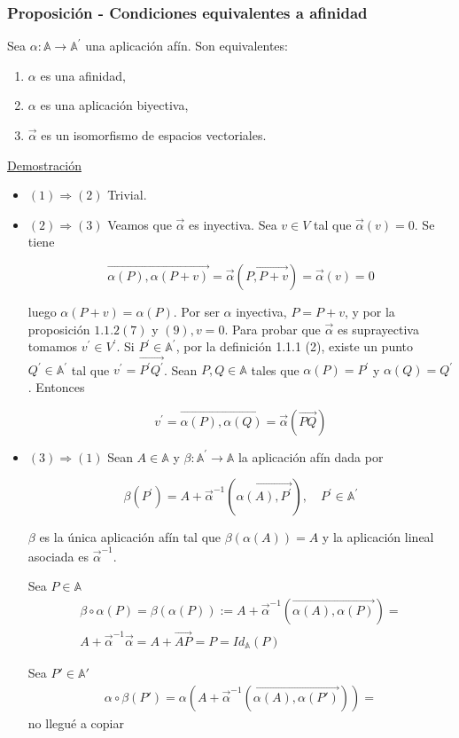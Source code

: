 \documentclass[12pt, a4paper, ones, notitlepage, openany,titlepage]{article}
\newcommand{\demostracion}{\noindent\underline{Demostración}}
\begin{document}
\subsubsection{Proposición - Condiciones equivalentes a afinidad}
	\noindent Sea $\alpha: \mathbb{A} \rightarrow \mathbb{A}^{\prime}$ una aplicación afín. Son equivalentes:
	\begin{enumerate}
		\item $\alpha$ es una afinidad,
		
		\item $\alpha$ es una aplicación biyectiva,
		
		\item $\vec{\alpha}$ es un isomorfismo de espacios vectoriales.
	\end{enumerate}

\demostracion 
	\begin{itemize}
		\item$(1) \Rightarrow(2)$ Trivial.
		
		\item$(2) \Rightarrow(3)$ Veamos que $\vec{\alpha}$ es inyectiva. Sea $v \in V$ tal que $\vec{\alpha}(v)=0$. Se tiene
		
		$$
		\overrightarrow{\alpha(P), \alpha(P+v)}=\vec{\alpha}(\overrightarrow{P, P+v})=\vec{\alpha}(v)=0
		$$
		
		luego $\alpha(P+v)=\alpha(P)$. Por ser $\alpha$ inyectiva, $P=P+v$, y por la proposición $1.1 .2(7)$ y $(9), v=0$. Para probar que $\vec{\alpha}$ es suprayectiva tomamos $v^{\prime} \in V^{\prime}$. Si $P^{\prime} \in \mathbb{A}^{\prime}$, por la definición 1.1.1 (2), existe un punto $Q^{\prime} \in \mathbb{A}^{\prime}$ tal que $v^{\prime}=\overrightarrow{P^{\prime} Q^{\prime}}$. Sean $P, Q \in \mathbb{A}$ tales que $\alpha(P)=P^{\prime}$ y $\alpha(Q)=Q^{\prime}$. Entonces
		
		$$
		v^{\prime}=\overrightarrow{\alpha(P), \alpha(Q)}=\vec{\alpha}(\overrightarrow{P Q})
		$$
		
		\item$(3) \Rightarrow(1)$ Sean $A \in \mathbb{A}$ y $\beta: \mathbb{A}^{\prime} \rightarrow \mathbb{A}$ la aplicación afín dada por
		
		$$
		\beta\left(P^{\prime}\right)=A+\vec{\alpha}^{-1}\left(\overrightarrow{\alpha(A), P^{\prime}}\right), \quad P^{\prime} \in \mathbb{A}^{\prime}
		$$
		
		$\beta$ es la única aplicación afín tal que $\beta(\alpha(A))=A$ y la aplicación lineal asociada es $\vec{\alpha}^{-1}$.
		
		Sea $P\in\mathbb{A}$
		\begin{gather*}
			\beta\circ\alpha(P)=\beta(\alpha(P)):=A+\vec{\alpha}^{-1}(\overrightarrow{\alpha(A),\alpha(P)}) =\\ A+\vec{\alpha}^{-1}\vec{\alpha}=A+\overrightarrow{AP}=P=Id_{\mathbb{A}}(P)
		\end{gather*}
		
		Sea $P'\in\mathbb{A'}$
		\begin{gather*}
			\alpha\circ\beta(P')=\alpha(A+\vec{\alpha}^{-1}(\overrightarrow{\alpha(A),\alpha(P')})) = 
		\end{gather*} no llegué a copiar
	\end{itemize}
\end{document}
